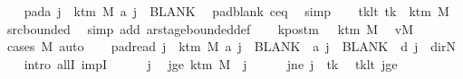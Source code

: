 \begin{isabellebody}
\ \ \isamarkupfalse%
\ pad{\isacharunderscore}{\kern0pt}a{\isacharcolon}{\kern0pt}\ {\isachardoublequoteopen}{\isasymforall}j\ {\isasymge}\ k{\isacharunderscore}{\kern0pt}tm\ M{\isachardot}{\kern0pt}\ {\isacharquery}{\kern0pt}a\ j\ {\isacharequal}{\kern0pt}\ BLANK{}{\isachardoublequoteclose}\ \isamarkupfalse%
\ pad{\isacharunderscore}{\kern0pt}blank\ c{\isacharprime}{\kern0pt}{\isacharunderscore}{\kern0pt}eq\ \isamarkupfalse%
\ simp\isanewline
\ \ \isamarkupfalse%
\ tk{\isacharunderscore}{\kern0pt}lt{\isacharcolon}{\kern0pt}\ {\isachardoublequoteopen}tk\ {\isacharless}{\kern0pt}\ k{\isacharunderscore}{\kern0pt}tm\ M{\isachardoublequoteclose}\ \isamarkupfalse%
\ src{\isacharunderscore}{\kern0pt}bounded\ \isamarkupfalse%
\ {\isacharparenleft}{\kern0pt}simp\ add{\isacharcolon}{\kern0pt}\ ar{\isacharunderscore}{\kern0pt}stage{\isacharunderscore}{\kern0pt}bounded{\isacharunderscore}{\kern0pt}def{\isacharparenright}{\kern0pt}\isanewline
\ \ \isamarkupfalse%
\ kpos{\isacharunderscore}{\kern0pt}tm{\isacharcolon}{\kern0pt}\ {\isachardoublequoteopen}{}\ {\isacharless}{\kern0pt}\ k{\isacharunderscore}{\kern0pt}tm\ M{\isachardoublequoteclose}\ \isamarkupfalse%
\ vM\ \isamarkupfalse%
\ {\isacharparenleft}{\kern0pt}cases\ M{\isacharparenright}{\kern0pt}\ auto\isanewline
\ \ \isamarkupfalse%
\ pad{\isacharunderscore}{\kern0pt}read{\isacharcolon}{\kern0pt}\ {\isachardoublequoteopen}{\isasymforall}j\ {\isasymge}\ k{\isacharunderscore}{\kern0pt}tm\ M{\isachardot}{\kern0pt}\ {\isacharquery}{\kern0pt}a\ j\ {\isacharequal}{\kern0pt}\ BLANK{}\ {\isasymand}\ {\isacharquery}{\kern0pt}a\ j\ {\isacharequal}{\kern0pt}\ BLANK{}\ {\isasymand}\ {\isacharquery}{\kern0pt}d\ j\ {\isacharequal}{\kern0pt}\ dir{\isachardot}{\kern0pt}N{\isachardoublequoteclose}\isanewline
\ \ \isamarkupfalse%
\ {\isacharparenleft}{\kern0pt}intro\ allI\ impI{\isacharparenright}{\kern0pt}\isanewline
\ \ \ \ \isamarkupfalse%
\ j\ \isamarkupfalse%
\ jge{\isacharcolon}{\kern0pt}\ {\isachardoublequoteopen}k{\isacharunderscore}{\kern0pt}tm\ M\ {\isasymle}\ j{\isachardoublequoteclose}\isanewline
\ \ \ \ \isamarkupfalse%
\ jne{\isacharcolon}{\kern0pt}\ {\isachardoublequoteopen}j\ {\isasymnoteq}\ tk{\isachardoublequoteclose}\ \isamarkupfalse%
\ tk{\isacharunderscore}{\kern0pt}lt\ jge\ \isamarkupfalse%

\end{isabellebody}
